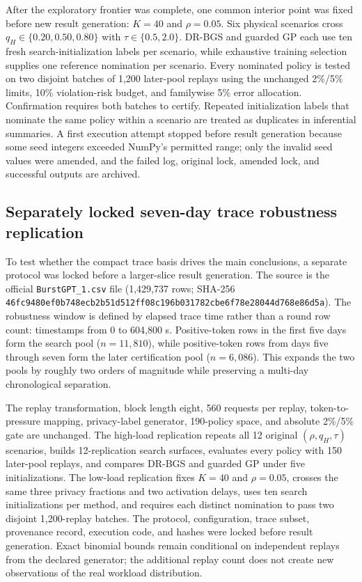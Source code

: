 \documentclass[preprint,12pt]{elsarticle}
\begin{document}
After the exploratory frontier was complete, one common interior point was fixed before new result generation: $K=40$ and $\rho=0.05$. Six physical scenarios cross $q_H\in\{0.20,0.50,0.80\}$ with $\tau\in\{0.5,2.0\}$. DR-BGS and guarded GP each use ten fresh search-initialization labels per scenario, while exhaustive training selection supplies one reference nomination per scenario. Every nominated policy is tested on two disjoint batches of 1,200 later-pool replays using the unchanged 2\%/5\% limits, 10\% violation-risk budget, and familywise 5\% error allocation. Confirmation requires both batches to certify. Repeated initialization labels that nominate the same policy within a scenario are treated as duplicates in inferential summaries. A first execution attempt stopped before result generation because some seed integers exceeded NumPy's permitted range; only the invalid seed values were amended, and the failed log, original lock, amended lock, and successful outputs are archived.

\subsection{Separately locked seven-day trace robustness replication}
\label{sec:v15design}

To test whether the compact trace basis drives the main conclusions, a separate protocol was locked before a larger-slice result generation. The source is the official \texttt{BurstGPT\_1.csv} file (1,429,737 rows; SHA-256 \texttt{46fc9480\allowbreak ef0b748e\allowbreak cb2b51d5\allowbreak 12ff08c1\allowbreak 96b03178\allowbreak 2cbe6f78\allowbreak e28044d7\allowbreak 68e86d5a}). The robustness window is defined by elapsed trace time rather than a round row count: timestamps from 0 to 604,800 s. Positive-token rows in the first five days form the search pool ($n=11{,}810$), while positive-token rows from days five through seven form the later certification pool ($n=6{,}086$). This expands the two pools by roughly two orders of magnitude while preserving a multi-day chronological separation.

The replay transformation, block length eight, 560 requests per replay, token-to-pressure mapping, privacy-label generator, 190-policy space, and absolute 2\%/5\% gate are unchanged. The high-load replication repeats all 12 original $(\rho,q_H,\tau)$ scenarios, builds 12-replication search surfaces, evaluates every policy with 150 later-pool replays, and compares DR-BGS and guarded GP under five initializations. The low-load replication fixes $K=40$ and $\rho=0.05$, crosses the same three privacy fractions and two activation delays, uses ten search initializations per method, and requires each distinct nomination to pass two disjoint 1,200-replay batches. The protocol, configuration, trace subset, provenance record, execution code, and hashes were locked before result generation. Exact binomial bounds remain conditional on independent replays from the declared generator; the additional replay count does not create new observations of the real workload distribution.
\end{document}
